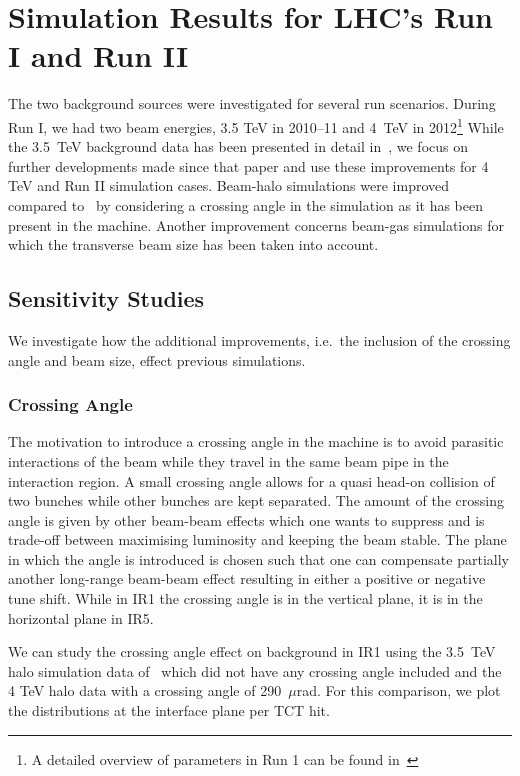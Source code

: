 \section{Simulation Results for LHC's Run I and Run II}

The two background sources were investigated for several run scenarios. During Run I, we had two beam energies, 3.5 TeV in 2010--11 and 4~TeV in 2012\footnote{A detailed overview of parameters in Run 1 can be found in~\cite{ParametersRun1}} While the 3.5~TeV background data has been presented in detail in~\cite{nimPaperRod}, we focus on further developments made since that paper and use these improvements for 4 TeV and Run II simulation cases. Beam-halo simulations were improved compared to~\cite{nimPaperRod} by considering a crossing angle in the simulation as it has been present in the machine. Another improvement concerns beam-gas simulations for which the transverse beam size has been taken into account. 
\subsection{Sensitivity Studies}
We investigate how the additional improvements, i.e.~the inclusion of the crossing angle and beam size, effect previous simulations.

\subsubsection{Crossing Angle}
The motivation to introduce a crossing angle in the machine is to avoid parasitic interactions of the beam while they travel in the same beam pipe in the interaction region. A small crossing angle allows for a quasi head-on collision of two bunches while other bunches are kept separated. The amount of the crossing angle is given by other beam-beam effects which one wants to suppress and is trade-off between maximising luminosity and keeping the beam stable. The plane in which the angle is introduced is chosen such that one can compensate partially another long-range beam-beam effect resulting in either a positive or negative tune shift. While in IR1 the crossing angle is in the vertical plane, it is in the horizontal plane in IR5.

We can study the crossing angle effect on background in IR1 using the 3.5~TeV halo simulation data of~\cite{nimPaperRod} which did not have any crossing angle included and the 4 TeV halo data with a crossing angle of 290~$\mu$rad. For this comparison, we plot the distributions at the interface plane per TCT hit. 


